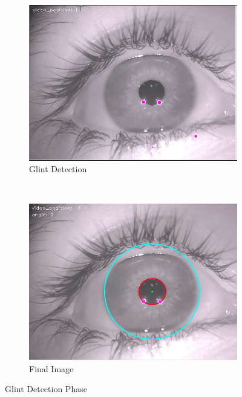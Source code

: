 \begin{figure}[h!]
	\centering
	
	\begin{subfigure}[b]{0.5\textwidth}
		\includegraphics[width=\textwidth]{final/images/glitDetection.png}
		\caption{Glint Detection}
		\label{subfig:glints}
	\end{subfigure}%
	~
	\begin{subfigure}[b]{0.5\textwidth}
		\centering
		\includegraphics[width=\textwidth]{final/images/final.png}
		\caption{Final Image}
		\label{subfig:final}
	\end{subfigure}
	
	\caption{Glint Detection Phase}
\end{figure}



